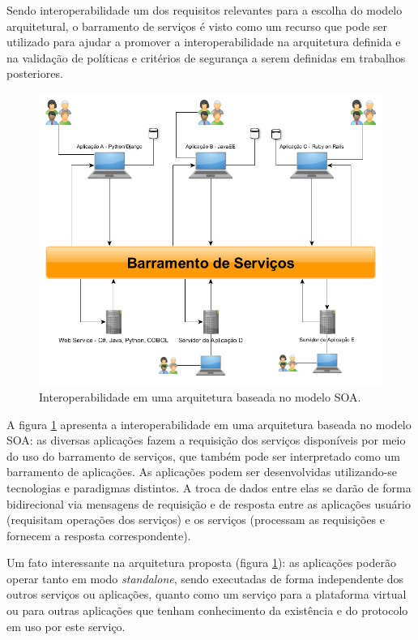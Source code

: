 Sendo interoperabilidade um dos requisitos relevantes para a escolha do modelo arquitetural, o barramento de serviços é visto como um recurso que pode ser utilizado para ajudar a promover a interoperabilidade na arquitetura definida e na validação de políticas e critérios de segurança a serem definidas em trabalhos posteriores.

\begin{figure}[!hbt]
\centering
\includegraphics[scale=0.4]{figuras/barramento_interoperabilidade.png}
\caption{Interoperabilidade em uma arquitetura baseada no modelo SOA.}
\label{barramento_interoperabilidade}
\end{figure}

A figura \ref{barramento_interoperabilidade} apresenta a interoperabilidade em uma arquitetura baseada no modelo SOA:  as diversas aplicações fazem a requisição dos serviços disponíveis por meio do uso do barramento de serviços, que também pode ser interpretado como um barramento de aplicações. As aplicações podem ser desenvolvidas utilizando-se tecnologias e paradigmas distintos. A troca de dados entre elas se darão de forma bidirecional via mensagens de requisição e de resposta entre as aplicações usuário (requisitam operações dos serviços) e os serviços (processam as requisições e fornecem a resposta correspondente).

Um fato interessante na arquitetura proposta (figura \ref{barramento_interoperabilidade}): as aplicações poderão operar tanto em modo \textit{standalone}, sendo executadas de forma independente dos outros serviços ou aplicações, quanto como um serviço para a plataforma virtual ou para outras aplicações que tenham conhecimento da existência e do protocolo em uso por este serviço.

